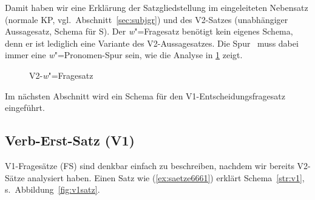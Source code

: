 Damit haben wir eine Erklärung der Satzgliedstellung im eingeleiteten Nebensatz (normale KP, vgl.\ Abschnitt~\ref{sec:subjgr}) und des V2-Satzes (unabhängiger Aussagesatz, Schema für S).
Der \textit{w}"=Fragesatz benötigt kein eigenes Schema, denn er ist lediglich eine Variante des V2-Aussagesatzes.
Die Spur \Tii\ muss dabei immer eine \textit{w}"=Pronomen-Spur sein, wie die Analyse in \ref{fig:v2fragesatz} zeigt.

\begin{figure}[h]
  \centering
  \vspace{0.3cm}
  \caption{V2-\textit{w}"=Fragesatz}
  \label{fig:v2fragesatz}
\end{figure}

Im nächsten Abschnitt wird ein Schema für den V1-Entscheidungsfragesatz eingeführt.

\subsection{Verb-Erst-Satz (V1)}

\label{sec:verberstsatz}



\begin{sloppypar}
V1-Fragesätze (FS) sind denkbar einfach zu beschreiben, nachdem wir bereits V2-Sätze analysiert haben.
Einen Satz wie (\ref{ex:saetze6661}) erklärt Schema~\ref{str:v1}, s.\ Abbildung~\ref{fig:v1satz}.
\end{sloppypar}

